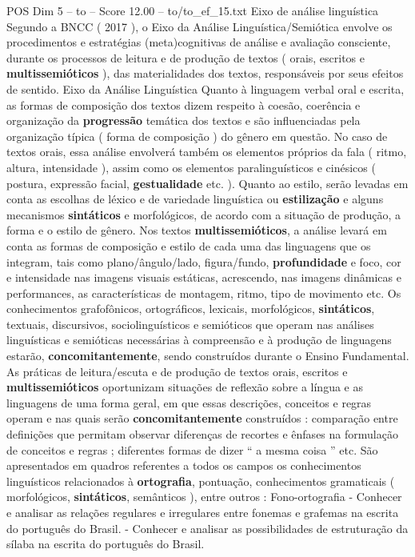 \begin{textsample}{POS Dim 5 – to – Score 12.00 – to/to\_ef\_15.txt}  \label{ex:f5_pos_024}
Eixo de análise linguística Segundo a BNCC ( 2017 ), o Eixo da Análise Linguística/Semiótica envolve os procedimentos e estratégias (meta)cognitivas de análise e avaliação consciente, durante os processos de leitura e de produção de textos ( orais, escritos e \textbf{multissemióticos} ), das materialidades dos textos, responsáveis por seus efeitos de sentido.
Eixo da Análise Linguística Quanto à linguagem verbal oral e escrita, as formas de composição dos textos dizem respeito à coesão, coerência e organização da \textbf{progressão} temática dos textos e são influenciadas pela organização típica ( forma de composição ) do gênero em questão.
No caso de textos orais, essa análise envolverá também os elementos próprios da fala ( ritmo, altura, intensidade ), assim como os elementos paralinguísticos e cinésicos ( postura, expressão facial, \textbf{gestualidade} etc. ).
Quanto ao estilo, serão levadas em conta as escolhas de léxico e de variedade linguística ou \textbf{estilização} e alguns mecanismos \textbf{sintáticos} e morfológicos, de acordo com a situação de produção, a forma e o estilo de gênero.
Nos textos \textbf{multissemióticos}, a análise levará em conta as formas de composição e estilo de cada uma das linguagens que os integram, tais como plano/ângulo/lado, figura/fundo, \textbf{profundidade} e foco, cor e intensidade nas imagens visuais estáticas, acrescendo, nas imagens dinâmicas e performances, as características de montagem, ritmo, tipo de movimento etc.
Os conhecimentos grafofônicos, ortográficos, lexicais, morfológicos, \textbf{sintáticos}, textuais, discursivos, sociolinguísticos e semióticos que operam nas análises linguísticas e semióticas necessárias à compreensão e à produção de linguagens estarão, \textbf{concomitantemente}, sendo construídos durante o Ensino Fundamental.
As práticas de leitura/escuta e de produção de textos orais, escritos e \textbf{multissemióticos} oportunizam situações de reflexão sobre a língua e as linguagens de uma forma geral, em que essas descrições, conceitos e regras operam e nas quais serão \textbf{concomitantemente} construídos : comparação entre definições que permitam observar diferenças de recortes e ênfases na formulação de conceitos e regras ; diferentes formas de dizer “ a mesma coisa ” etc.
São apresentados em quadros referentes a todos os campos os conhecimentos linguísticos relacionados à \textbf{ortografia}, pontuação, conhecimentos gramaticais ( morfológicos, \textbf{sintáticos}, semânticos ), entre outros : Fono-ortografia - Conhecer e analisar as relações regulares e irregulares entre fonemas e grafemas na escrita do português do Brasil. - Conhecer e analisar as possibilidades de estruturação da sílaba na escrita do português do Brasil.

\end{textsample}
